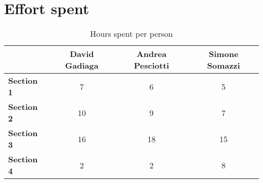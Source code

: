 \chapter{Effort spent}

\begin{table}[!ht]
    \centering 
    \begin{tabular}{|p{5em} | c | c | c |}
    \hline
    \rowcolor{bluepoli!40} 
    \textbf{ } &\textbf{David Gadiaga} & \textbf{Andrea Pesciotti} & \textbf{Simone Somazzi} \T\B \\
    \hline \hline
    \textbf{Section 1} & 7 & 6 & 5 \T\B \\
    \hline
    \textbf{Section 2} & 10 & 9 & 7 \T\B\\
    \hline
    \textbf{Section 3} & 16 & 18 & 15 \T\B\\
    \hline
    \textbf{Section 4} & 2 & 2 & 8 \T\B\\
    \hline
    \end{tabular}
    \\[10pt]
    \caption{Hours spent per person}
    \label{table:example}
\end{table}